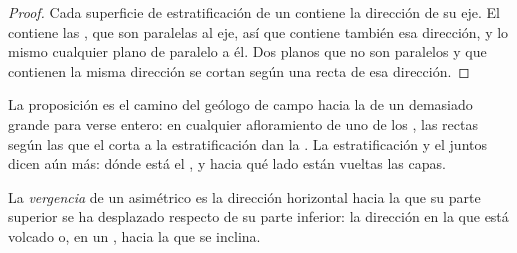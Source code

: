 \begin{proof}
Cada superficie de estratificación de un  contiene la dirección de su eje. El  contiene las , que son paralelas al eje, así que contiene también esa dirección, y lo mismo cualquier plano de  paralelo a
él. Dos planos que no son paralelos y que contienen la misma dirección se cortan según una recta de esa dirección.
\end{proof}

La proposición es el camino del geólogo de campo hacia la  de un  demasiado grande para verse entero: en cualquier
afloramiento de uno de los , las rectas según las que el  corta a la estratificación dan la . La
estratificación y el  juntos dicen aún más: dónde está el , y hacia qué lado están vueltas las capas.

\begin{definition}[Vergencia]\label{def:b1:faults-folds-fabrics:vergence}
La \emph{vergencia} de un  asimétrico es la dirección horizontal hacia la que su parte superior se ha
desplazado respecto de su parte inferior: la dirección en la que está volcado o, en un , hacia la que se
inclina.
\end{definition}

